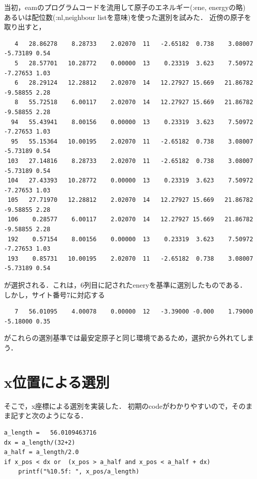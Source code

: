     当初，eamのプログラムコードを流用して原子のエネルギー(:ene, energyの略)
あるいは配位数(:nl,neighbour listを意味)を使った選別を試みた．
近傍の原子を取り出すと，

\begin{verbatim}
   4   28.86278    8.28733    2.02070  11   -2.65182  0.738    3.08007   -5.73189 0.54
   5   28.57701   10.28772    0.00000  13    0.23319  3.623    7.50972   -7.27653 1.03
   6   28.29124   12.28812    2.02070  14   12.27927 15.669   21.86782   -9.58855 2.28
   8   55.72518    6.00117    2.02070  14   12.27927 15.669   21.86782   -9.58855 2.28
  94   55.43941    8.00156    0.00000  13    0.23319  3.623    7.50972   -7.27653 1.03
  95   55.15364   10.00195    2.02070  11   -2.65182  0.738    3.08007   -5.73189 0.54
 103   27.14816    8.28733    2.02070  11   -2.65182  0.738    3.08007   -5.73189 0.54
 104   27.43393   10.28772    0.00000  13    0.23319  3.623    7.50972   -7.27653 1.03
 105   27.71970   12.28812    2.02070  14   12.27927 15.669   21.86782   -9.58855 2.28
 106    0.28577    6.00117    2.02070  14   12.27927 15.669   21.86782   -9.58855 2.28
 192    0.57154    8.00156    0.00000  13    0.23319  3.623    7.50972   -7.27653 1.03
 193    0.85731   10.00195    2.02070  11   -2.65182  0.738    3.08007   -5.73189 0.54
\end{verbatim}

が選択される．これは，6列目に記されたeneryを基準に選別したものである．
しかし，サイト番号7に対応する

\begin{verbatim}
   7   56.01095    4.00078    0.00000  12   -3.39000 -0.000    1.79000   -5.18000 0.35
\end{verbatim}

がこれらの選別基準では最安定原子と同じ環境であるため，選択から外れてしまう．

    \section{x位置による選別}\label{xux4f4dux7f6eux306bux3088ux308bux9078ux5225}

そこで，x座標による選別を実装した．
初期のcodeがわかりやすいので，そのまま記すと次のようになる．

\begin{verbatim}
a_length =   56.0109463716
dx = a_length/(32+2)
a_half = a_length/2.0
if x_pos < dx or  (x_pos > a_half and x_pos < a_half + dx)
    printf("%10.5f: ", x_pos/a_length)
\end{verbatim}

